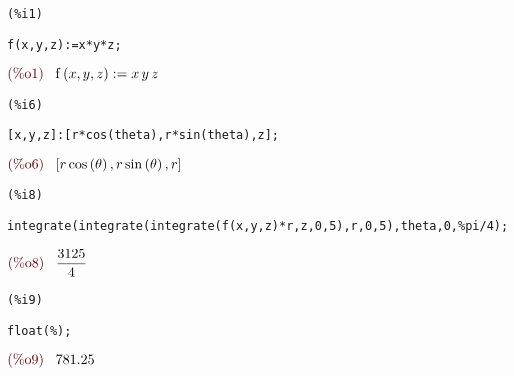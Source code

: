 \documentclass{article}
\begin{document}
\noindent
\begin{minipage}[t]{8ex}{\color{red}\bf
\begin{verbatim}
(%i1) 
\end{verbatim}}
\end{minipage}
\begin{minipage}[t]{\textwidth}{\color{blue}
\begin{verbatim}
f(x,y,z):=x*y*z;
\end{verbatim}}
\end{minipage}
\begin{math}\displaystyle
\parbox{8ex}{\color{labelcolor}(\%o1) }
\mathrm{f}\left( x,y,z\right) :=x\,y\,z
\end{math}


\noindent
\begin{minipage}[t]{8ex}{\color{red}\bf
\begin{verbatim}
(%i6) 
\end{verbatim}}
\end{minipage}
\begin{minipage}[t]{\textwidth}{\color{blue}
\begin{verbatim}
[x,y,z]:[r*cos(theta),r*sin(theta),z];
\end{verbatim}}
\end{minipage}
\begin{math}\displaystyle
\parbox{8ex}{\color{labelcolor}(\%o6) }
[r\,\mathrm{cos}\left( \theta\right) ,r\,\mathrm{sin}\left( \theta\right) ,r]
\end{math}


\noindent
\begin{minipage}[t]{8ex}{\color{red}\bf
\begin{verbatim}
(%i8) 
\end{verbatim}}
\end{minipage}
\begin{minipage}[t]{\textwidth}{\color{blue}
\begin{verbatim}
integrate(integrate(integrate(f(x,y,z)*r,z,0,5),r,0,5),theta,0,%pi/4);
\end{verbatim}}
\end{minipage}
\begin{math}\displaystyle
\parbox{8ex}{\color{labelcolor}(\%o8) }
\frac{3125}{4}
\end{math}


\noindent
\begin{minipage}[t]{8ex}{\color{red}\bf
\begin{verbatim}
(%i9) 
\end{verbatim}}
\end{minipage}
\begin{minipage}[t]{\textwidth}{\color{blue}
\begin{verbatim}
float(%);
\end{verbatim}}
\end{minipage}
\begin{math}\displaystyle
\parbox{8ex}{\color{labelcolor}(\%o9) }
781.25
\end{math}
\end{document}
